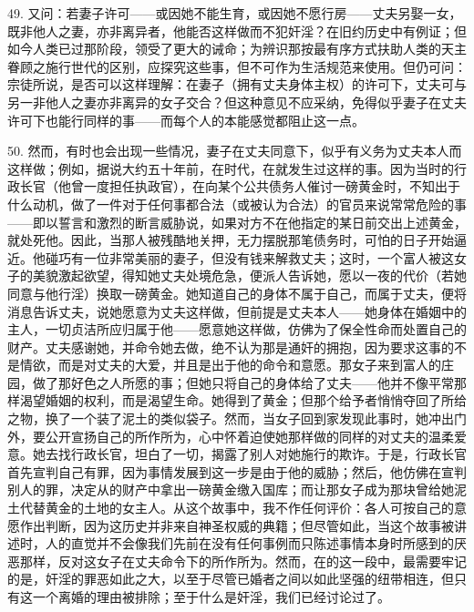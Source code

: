 49. 又问：若妻子许可——或因她不能生育，或因她不愿行房——丈夫另娶一女，既非他人之妻，亦非离异者，他能否这样做而不犯奸淫？在旧约历史中有例证；但如今人类已过那阶段，领受了更大的诫命；为辨识那按最有序方式扶助人类的天主眷顾之施行世代的区别，应探究这些事，但不可作为生活规范来使用。但仍可问：宗徒所说，是否可以这样理解：在妻子（拥有丈夫身体主权）的许可下，丈夫可与另一非他人之妻亦非离异的女子交合？但这种意见不应采纳，免得似乎妻子在丈夫许可下也能行同样的事——而每个人的本能感觉都阻止这一点。\par

50. 然而，有时也会出现一些情况，妻子在丈夫同意下，似乎有义务为丈夫本人而这样做；例如，据说大约五十年前，在时代，在就发生过这样的事。因为当时的行政长官（他曾一度担任执政官），在向某个公共债务人催讨一磅黄金时，不知出于什么动机，做了一件对于任何事都合法（或被认为合法）的官员来说常常危险的事——即以誓言和激烈的断言威胁说，如果对方不在他指定的某日前交出上述黄金，就处死他。因此，当那人被残酷地关押，无力摆脱那笔债务时，可怕的日子开始逼近。他碰巧有一位非常美丽的妻子，但没有钱来解救丈夫；这时，一个富人被这女子的美貌激起欲望，得知她丈夫处境危急，便派人告诉她，愿以一夜的代价（若她同意与他行淫）换取一磅黄金。她知道自己的身体不属于自己，而属于丈夫，便将消息告诉丈夫，说她愿意为丈夫这样做，但前提是丈夫本人——她身体在婚姻中的主人，一切贞洁所应归属于他——愿意她这样做，仿佛为了保全性命而处置自己的财产。丈夫感谢她，并命令她去做，绝不认为那是通奸的拥抱，因为要求这事的不是情欲，而是对丈夫的大爱，并且是出于他的命令和意愿。那女子来到富人的庄园，做了那好色之人所愿的事；但她只将自己的身体给了丈夫——他并不像平常那样渴望婚姻的权利，而是渴望生命。她得到了黄金；但那个给予者悄悄夺回了所给之物，换了一个装了泥土的类似袋子。然而，当女子回到家发现此事时，她冲出门外，要公开宣扬自己的所作所为，心中怀着迫使她那样做的同样的对丈夫的温柔爱意。她去找行政长官，坦白了一切，揭露了别人对她施行的欺诈。于是，行政长官首先宣判自己有罪，因为事情发展到这一步是由于他的威胁；然后，他仿佛在宣判别人的罪，决定从的财产中拿出一磅黄金缴入国库；而让那女子成为那块曾给她泥土代替黄金的土地的女主人。从这个故事中，我不作任何评价：各人可按自己的意愿作出判断，因为这历史并非来自神圣权威的典籍；但尽管如此，当这个故事被讲述时，人的直觉并不会像我们先前在没有任何事例而只陈述事情本身时所感到的厌恶那样，反对这女子在丈夫命令下的所作所为。然而，在的这一段中，最需要牢记的是，奸淫的罪恶如此之大，以至于尽管已婚者之间以如此坚强的纽带相连，但只有这一个离婚的理由被排除；至于什么是奸淫，我们已经讨论过了。\par

